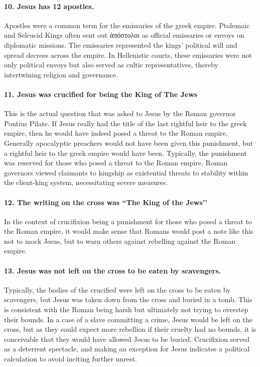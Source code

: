 \paragraph{10.
Jesus has 12 apostles.}\label{par:jesus-has-12-apostles.}
Apostles were a common term for the emissaries of the greek empire.
Ptolemaic and Seleucid Kings often sent out ἀπόστολοι as official emissaries or envoys on diplomatic missions.
The emissaries represented the kings’ political will and spread decrees across the empire.
In Hellenistic courts, these emissaries were not only political envoys but also served as cultic representatives, thereby intertwining religion and governance.
\paragraph{11.
Jesus was crucified for being the King of The Jews}\label{par:jesus-was-crucified-for-being-the-king-of-the-jews}
This is the actual question that was asked to Jesus by the Roman governor Pontius Pilate.
If Jesus really had the title of the last rightful heir to the greek empire, then he would have indeed posed a threat to the Roman empire.
Generally apocalyptic preachers would not have been given this punishment, but a rightful heir to the greek empire would have been.
Typically, the punishment was reserved for those who posed a threat to the Roman empire.
Roman governors viewed claimants to kingship as existential threats to stability within the client-king system, necessitating severe measures.
\paragraph{12.
The writing on the cross was ``The King of the Jews’’}\label{par:the-writing-on-the-cross-was-the-king-of-the-jews}
In the context of crucifixion being a punishment for those who posed a threat to the Roman empire, it would make sense that Romans would post a note like this not to mock Jesus, but to warn others against rebelling against the Roman empire.
\paragraph{13.
Jesus was not left on the cross to be eaten by scavengers.}\label{par:jesus-was-not-left-on-the-cross-to-be-eaten-by-scavengers.}
Typically, the bodies of the crucified were left on the cross to be eaten by scavengers, but Jesus was taken down from the cross and buried in a tomb.
This is consistent with the Roman being harsh but ultimately not trying to overstep their bounds.
In a case of a slave committing a crime, Jesus would be left on the cross, but as they could expect more rebellion if their cruelty had no bounds, it is conceivable that they would have allowed Jesus to be buried.
Crucifixion served as a deterrent spectacle, and making an exception for Jesus indicates a political calculation to avoid inciting further unrest.

